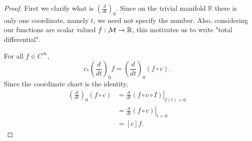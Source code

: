 \documentclass[../main.tex]{subfiles}
\begin{document}
    \begin{proof}
        First we clarify what is \(\left(\frac{d}{dt}\right)_0\). Since on the 
        trivial manifold \(\mathbb{R}\) there is only one coordinate, namely 
        \(t\), we need not specify the number. Also, considering our functions 
        are scalar valued \(f : \manifold[M] \to \mathbb{R}\), this motivates us 
        to write "total differential". \par
        For all \(f \in C^\infty\), 
        \[
        c_*\left(\frac{d}{dt}\right)_0f=\left(\frac{d}{dt}\right)_0(f\circ c).
        \]
        Since the coordinate chart is the identity, 
        \[
        \begin{aligned}
            \left(\frac{d}{dt}\right)_0(f\circ c) 
            &= \left.\frac{d}{dt}(f\circ c\circ I)\right|_{I(t)=0} \\
            &= \left.\frac{d}{dt}(f\circ c)\right|_{t=0} \\
            &=[c]f.
        \end{aligned}
        \]
    \end{proof}
\end{document}
